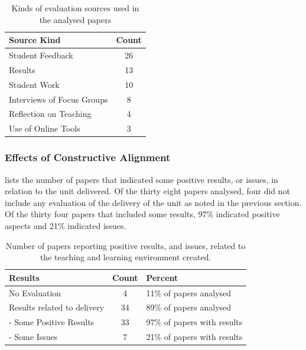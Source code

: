 \begin{table}[b]
	\centering
	\caption{Kinds of evaluation sources used in the analysed papers}
	\label{tbl:eval_kind}
	\footnotesize
    \begin{tabular}{l|c}
     \textbf{Source Kind} & \textbf{Count} \\ \hline
		Student Feedback	 & 26 \\
		Results	 & 13 \\
		Student Work	 & 10 \\
		Interviews of Focus Groups & 	8 \\
		Reflection on Teaching & 	4 \\
		Use of Online Tools & 	3 \\
    \end{tabular}
\end{table}





\clearpage

\subsubsection{Effects of Constructive Alignment} %
\label{sub:effects_of_constructive_alignment}

 lists the number of papers that indicated some positive results, or issues, in relation to the unit delivered. Of the thirty eight papers analysed, four did not include any evaluation of the delivery of the unit as noted in the previous section. Of the thirty four papers that included some results, 97\% indicated positive aspects and 21\% indicated issues.

\begin{table}[p]
	\centering
	\caption{Number of papers reporting positive results, and issues, related to the teaching and learning environment created.}
	\label{tbl:paper_results}
	\footnotesize
    \begin{tabular}{l|c|l}
     \textbf{Results} & \textbf{Count} & \textbf{Percent} \\ \hline
		No Evaluation & 	4 &	11\% of papers analysed \\
     	Results related to delivery & 34 & 89\% of papers analysed \\
		- Some Positive Results	 & 33 &	97\% of papers with results \\
		- Some Issues & 	7 &	21\% of papers with results  \\
    \end{tabular}
\end{table}

